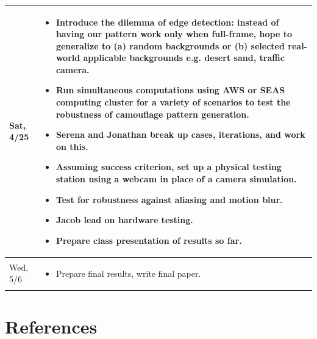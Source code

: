\documentclass[12pt,letter]{article}
\begin{document}
\begin{table}[H]
\begin{tabular}{|p{} | p{}|}
Sat, 4/25 &\begin{itemize} \item Introduce the dilemma of edge detection: instead of having our pattern work only when full-frame, hope to generalize to (a) random backgrounds or (b) selected real-world applicable backgrounds e.g. desert sand, traffic camera. \item Run simultaneous computations using AWS or SEAS computing cluster for a variety of scenarios to test the robustness of camouflage pattern generation. \item Serena and Jonathan break up cases, iterations, and work on this. \item Assuming success criterion, set up a physical testing station using a webcam in place of a camera simulation. \item Test for robustness against aliasing and motion blur. \item Jacob lead on hardware testing.  \item Prepare class presentation of results so far.       \end{itemize}                                                  \\ \hline
Wed, 5/6  & \begin{itemize} \item Prepare final results, write final paper.                                                                                                                                                                                                                                                                                                                                                                                                                                                                                                                                                                                                                                                                                                                                                                                           \end{itemize}  \\ \hline
\end{tabular}
\end{table}

\section{References} 
\end{document}
